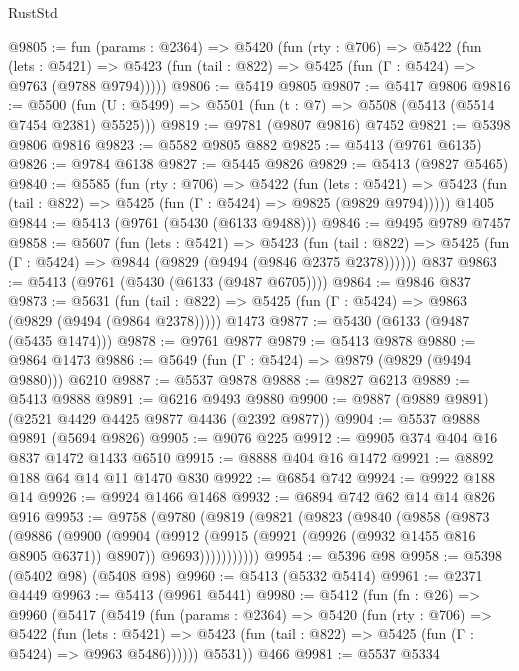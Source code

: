 \begin{lexlean}{RustStd}
\begin{coremodule}
@9805 := fun (params : @2364) =>
  @5420
    (fun (rty : @706) =>
    @5422
      (fun (lets : @5421) =>
      @5423 (fun (tail : @822) => @5425 (fun (Γ : @5424) => @9763 (@9788 @9794)))))
@9806 := @5419 @9805
@9807 := @5417 @9806
@9816 := @5500 (fun (U : @5499) => @5501 (fun (t : @7) => @5508 (@5413 (@5514 @7454 @2381) @5525)))
@9819 := @9781 (@9807 @9816) @7452
@9821 := @5398 @9806 @9816
@9823 := @5582 @9805 @882
@9825 := @5413 (@9761 @6135)
@9826 := @9784 @6138
@9827 := @5445 @9826
@9829 := @5413 (@9827 @5465)
@9840 := @5585
    (fun (rty : @706) =>
    @5422
      (fun (lets : @5421) =>
      @5423 (fun (tail : @822) => @5425 (fun (Γ : @5424) => @9825 (@9829 @9794)))))
    @1405
@9844 := @5413 (@9761 (@5430 (@6133 @9488)))
@9846 := @9495 @9789 @7457
@9858 := @5607
    (fun (lets : @5421) =>
    @5423
      (fun (tail : @822) => @5425 (fun (Γ : @5424) => @9844 (@9829 (@9494 (@9846 @2375 @2378))))))
    @837
@9863 := @5413 (@9761 (@5430 (@6133 (@9487 @6705))))
@9864 := @9846 @837
@9873 := @5631
    (fun (tail : @822) => @5425 (fun (Γ : @5424) => @9863 (@9829 (@9494 (@9864 @2378)))))
    @1473
@9877 := @5430 (@6133 (@9487 (@5435 @1474)))
@9878 := @9761 @9877
@9879 := @5413 @9878
@9880 := @9864 @1473
@9886 := @5649 (fun (Γ : @5424) => @9879 (@9829 (@9494 @9880))) @6210
@9887 := @5537 @9878
@9888 := @9827 @6213
@9889 := @5413 @9888
@9891 := @6216 @9493 @9880
@9900 := @9887 (@9889 @9891) (@2521 @4429 @4425 @9877 @4436 (@2392 @9877))
@9904 := @5537 @9888 @9891 (@5694 @9826)
@9905 := @9076 @225
@9912 := @9905 @374 @404 @16 @837 @1472 @1433 @6510
@9915 := @8888 @404 @16 @1472
@9921 := @8892 @188 @64 @14 @11 @1470 @830
@9922 := @6854 @742
@9924 := @9922 @188 @14
@9926 := @9924 @1466 @1468
@9932 := @6894 @742 @62 @14 @14 @826 @916
@9953 := @9758
    (@9780
      (@9819
        (@9821
          (@9823
            (@9840
              (@9858
                (@9873
                  (@9886
                    (@9900
                      (@9904
                        (@9912
                          (@9915 (@9921 (@9926 (@9932 @1455 @816 @8905 @6371)) @8907))
                          @9693)))))))))))
@9954 := @5396 @98
@9958 := @5398 (@5402 @98) (@5408 @98)
@9960 := @5413 (@5332 @5414)
@9961 := @2371 @4449
@9963 := @5413 (@9961 @5441)
@9980 := @5412
    (fun (fn : @26) =>
    @9960
      (@5417
        (@5419
          (fun (params : @2364) =>
          @5420
            (fun (rty : @706) =>
            @5422
              (fun (lets : @5421) =>
              @5423 (fun (tail : @822) => @5425 (fun (Γ : @5424) => @9963 @5486))))))
        @5531))
    @466
@9981 := @5537 @5334

\end{coremodule}
\end{lexlean}

